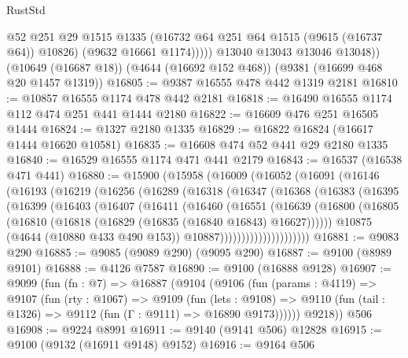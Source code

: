 \begin{lexlean}{RustStd}
\begin{coremodule}
                @52
                @251
                @29
                @1515
                @1335
                (@16732 @64 @251 @64 @1515 (@9615 (@16737 @64)) @10826)
                (@9632 @16661 @1174)))))
        @13040
        @13043
        @13046
        @13048))
    (@10649 (@16687 @18))
    (@4644 (@16692 @152 @468))
    (@9381 (@16699 @468 @20 @1457 @1319))
@16805 := @9387 @16555 @478 @442 @1319 @2181
@16810 := @10857 @16555 @1174 @478 @442 @2181
@16818 := @16490 @16555 @1174 @112 @474 @251 @441 @1444 @2180
@16822 := @16609 @476 @251 @16505 @1444
@16824 := @1327 @2180 @1335
@16829 := @16822 @16824 (@16617 @1444 @16620 @10581)
@16835 := @16608 @474 @52 @441 @29 @2180 @1335
@16840 := @16529 @16555 @1174 @471 @441 @2179
@16843 := @16537 (@16538 @471 @441)
@16880 := @15900
    (@15958
      (@16009
        (@16052
          (@16091
            (@16146
              (@16193
                (@16219
                  (@16256
                    (@16289
                      (@16318
                        (@16347
                          (@16368
                            (@16383
                              (@16395
                                (@16399
                                  (@16403
                                    (@16407
                                      (@16411
                                        (@16460
                                          (@16551
                                            (@16639
                                              (@16800
                                                (@16805
                                                  (@16810
                                                    (@16818
                                                      (@16829 (@16835 (@16840 @16843) @16627))))))
                                              @10875
                                              (@4644 (@10880 @433 @490 @153))
                                              @10887)))))))))))))))))))))
@16881 := @9083 @290
@16885 := @9085 (@9089 @290) (@9095 @290)
@16887 := @9100 (@8989 @9101)
@16888 := @4126 @7587
@16890 := @9100 (@16888 @9128)
@16907 := @9099
    (fun (fn : @7) =>
    @16887
      (@9104
        (@9106
          (fun (params : @4119) =>
          @9107
            (fun (rty : @1067) =>
            @9109
              (fun (lets : @9108) =>
              @9110 (fun (tail : @1326) => @9112 (fun (Γ : @9111) => @16890 @9173))))))
        @9218))
    @506
@16908 := @9224 @8991
@16911 := @9140 (@9141 @506) @12828
@16915 := @9100 (@9132 (@16911 @9148) @9152)
@16916 := @9164 @506

\end{coremodule}
\end{lexlean}
